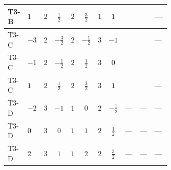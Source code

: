 \documentclass[8pt]{article}
\begin{document}
\begin{landscape}
\begin{longtable}{@{}llcccccc >{\raggedright\arraybackslash}p{0.21\linewidth} >{\raggedright\arraybackslash}p{0.21\linewidth} >{\raggedright\arraybackslash}p{0.21\linewidth}@{}}
\midrule
T3-B & $1$ & $2$ & $\frac{1}{2}$ & $2$ & $\frac{3}{2}$ & $1$ & $1$ & \scriptsize\adjustbox{max width=\linewidth}{$\begin{gathered} +\frac{27 {g_1}^4}{4}\end{gathered}$} & \scriptsize\adjustbox{max width=\linewidth}{$\begin{gathered} +\frac{3 {\lambda_{12}^{(A)}}^2}{4}\end{gathered}$} & --- \\
\midrule
T3-C & $-3$ & $2$ & $-\frac{3}{2}$ & $2$ & $-\frac{1}{2}$ & $3$ & $-1$ & \scriptsize\adjustbox{max width=\linewidth}{$\begin{gathered} +\frac{27 {g_1}^4}{4}\end{gathered}$} & \scriptsize\adjustbox{max width=\linewidth}{$\begin{gathered} +\frac{3 {\lambda_{12}^{(A)}}^2}{4}\end{gathered}$} & --- \\
\midrule
T3-C & $-1$ & $2$ & $-\frac{1}{2}$ & $2$ & $\frac{1}{2}$ & $3$ & $0$ & \scriptsize\adjustbox{max width=\linewidth}{$\begin{gathered} +\frac{3 {g_1}^4}{4}\end{gathered}$} & \scriptsize\adjustbox{max width=\linewidth}{$\begin{gathered} +\frac{3 {\lambda_{12}^{(A)}}^2}{4}\end{gathered}$} & \scriptsize\adjustbox{max width=\linewidth}{$\begin{gathered} -3 \operatorname{Tr}\!\left({y_1}\,\left({y_2}\right)^{\dagger}\,{y_2}\,\left({y_1}\right)^{\dagger}\right)\end{gathered}$} \\
\midrule
T3-C & $1$ & $2$ & $\frac{1}{2}$ & $2$ & $\frac{3}{2}$ & $3$ & $1$ & \scriptsize\adjustbox{max width=\linewidth}{$\begin{gathered} +\frac{27 {g_1}^4}{4}\end{gathered}$} & \scriptsize\adjustbox{max width=\linewidth}{$\begin{gathered} +\frac{3 {\lambda_{12}^{(A)}}^2}{4}\end{gathered}$} & --- \\
\midrule
T3-D & $-2$ & $3$ & $-1$ & $1$ & $0$ & $2$ & $-\frac{1}{2}$ & --- & --- & --- \\
\midrule
T3-D & $0$ & $3$ & $0$ & $1$ & $1$ & $2$ & $\frac{1}{2}$ & --- & --- & --- \\
\midrule
T3-D & $2$ & $3$ & $1$ & $1$ & $2$ & $2$ & $\frac{3}{2}$ & --- & --- & --- \\

\end{longtable}
\end{landscape}
\end{document}
